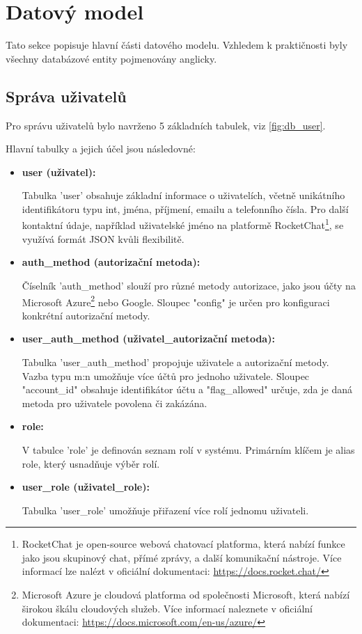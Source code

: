 \section{Datový model}

Tato sekce popisuje hlavní části datového modelu. Vzhledem k praktičnosti byly všechny databázové entity pojmenovány anglicky.

\subsection{Správa uživatelů}
Pro správu uživatelů bylo navrženo 5 základních tabulek, viz \vref{fig:db_user}.


Hlavní tabulky a jejich účel jsou následovné:

\begin{itemize}
  \item \textbf{user (uživatel):}
  
  Tabulka 'user' obsahuje základní informace o uživatelích, včetně unikátního identifikátoru typu int, jména, příjmení, emailu a telefonního čísla. Pro další kontaktní údaje, například uživatelské jméno na platformě RocketChat\footnote{RocketChat je open-source webová chatovací platforma, která nabízí funkce jako jsou skupinový chat, přímé zprávy, a další komunikační nástroje. Více informací lze nalézt v oficiální dokumentaci: \url{https://docs.rocket.chat/}}, se využívá formát JSON kvůli flexibilitě.
  
  \item \textbf{auth\_method (autorizační metoda):}
  
  Číselník 'auth\_method' slouží pro různé metody autorizace, jako jsou účty na Microsoft Azure\footnote{Microsoft Azure je cloudová platforma od společnosti Microsoft, která nabízí širokou škálu cloudových služeb. Více informací naleznete v oficiální dokumentaci: \url{https://docs.microsoft.com/en-us/azure/}} nebo Google. Sloupec "config" je určen pro konfiguraci konkrétní autorizační metody.

  \item \textbf{user\_auth\_method (uživatel\_autorizační metoda):}
  
  Tabulka 'user\_auth\_method' propojuje uživatele a autorizační metody. Vazba typu m:n umožňuje více účtů pro jednoho uživatele. Sloupec "account\_id" obsahuje identifikátor účtu a "flag\_allowed" určuje, zda je daná metoda pro uživatele povolena či zakázána.

  \item \textbf{role:}
  
  V tabulce 'role' je definován seznam rolí v systému. Primárním klíčem je alias role, který usnadňuje výběr rolí.

  \item \textbf{user\_role (uživatel\_role):}
  
  Tabulka 'user\_role' umožňuje přiřazení více rolí jednomu uživateli.

\end{itemize}


